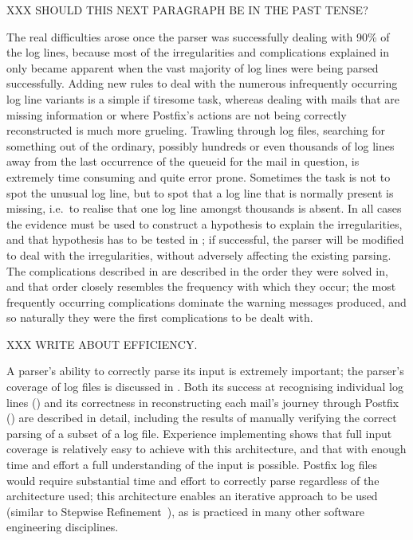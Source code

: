 XXX SHOULD THIS NEXT PARAGRAPH BE IN THE PAST TENSE\@?

The real difficulties arose once the parser was successfully dealing with
90\% of the log lines, because most of the irregularities and complications
explained in  only became apparent when the vast
majority of log lines were being parsed successfully.  Adding new rules to
deal with the numerous infrequently occurring log line variants is a simple
if tiresome task, whereas dealing with mails that are missing information
or where Postfix's actions are not being correctly reconstructed is much
more grueling.  Trawling through log files, searching for something out of
the ordinary, possibly hundreds or even thousands of log lines away from
the last occurrence of the queueid for the mail in question, is extremely
time consuming and quite error prone.  Sometimes the task is not to spot
the unusual log line, but to spot that a log line that is normally present
is missing, i.e.\ to realise that one log line amongst thousands is absent.
In all cases the evidence must be used to construct a hypothesis to explain
the irregularities, and that hypothesis has to be tested in \parsername{};
if successful, the parser will be modified to deal with the irregularities,
without adversely affecting the existing parsing.  The complications
described in  are described in the order they
were solved in, and that order closely resembles the frequency with which
they occur; the most frequently occurring complications dominate the
warning messages produced, and so naturally they were the first
complications to be dealt with.

XXX WRITE ABOUT EFFICIENCY\@.

A parser's ability to correctly parse its input is extremely important; the
parser's coverage of \numberOFlogFILES{} log files is discussed in
.  Both its success at recognising individual
log lines () and its correctness in
reconstructing each mail's journey through Postfix
() are described in detail, including the results
of manually verifying the correct parsing of a subset of a log file.
Experience implementing \parsername{} shows that full input coverage is
relatively easy to achieve with this architecture, and that with enough
time and effort a full understanding of the input is possible.  Postfix log
files would require substantial time and effort to correctly parse
regardless of the architecture used; this architecture enables an iterative
approach to be used (similar to Stepwise
Refinement~\cite{stepwise-refinement}), as is practiced in many other
software engineering disciplines.


